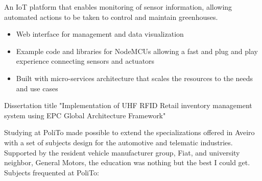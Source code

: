 \documentclass[10pt,a4paper,ragged2e,withhyper]{altacv}
\begin{document}
\begin{paracol}{2}

An IoT platform that enables monitoring of sensor information, allowing automated actions to be taken to control and maintain greenhouses. 
\begin{itemize}
\item Web interface for management and data visualization
\item Example code and libraries for NodeMCUs allowing a fast and plug and play experience connecting sensors and actuators
\item Built with micro-services architecture that scales the resources to the needs and use cases
\end{itemize}

\medskip





Dissertation title "Implementation of UHF RFID Retail inventory management system using EPC Global Architecture Framework"
\iffalse
\begin{itemize}
  \item RF survey of industrial shelves for EPC Class1 Gen2 passive tag readings
  \item Optimized RF operations, report contents and tag filtering through the LLRP protocol
  \item Architecture follows the supply-chain specifications in the EPC Global Framework
  \item Used Docker to containerize and orchestrate Fosstrak Java services
  \item Developed HTTP services (REST, websockets) using Golang
  \item Developed a web interface for inventory management with React JS
\end{itemize} 
\fi

\divider


Studying at PoliTo made possible to extend the specializations offered in Aveiro with a set of subjects design for the automotive and telematic industries. Supported by the resident vehicle manufacturer group, Fiat, and university neighbor, General Motors, the education was nothing but the best I could get.
Subjects frequented at PoliTo:


\end{paracol}
\end{document}
